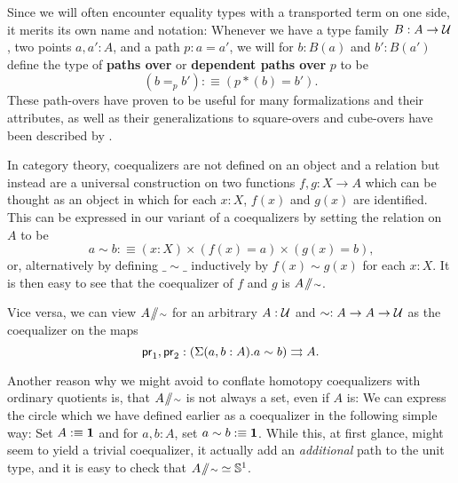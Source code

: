 \begin{remark}[Pathovers]
Since we will often encounter equality types with a transported term on one
side, it merits its own name and notation:
Whenever we have a type family $B : A \to \mathcal{U}$, two points $a, a' : A$,
and a path $p : a = a'$, we will for $b : B(a)$ and $b' : B(a')$ define the
type of
\textbf{paths over} or \textbf{dependent paths over} $p$ to be
\begin{equation*}
(b =_p b') :\equiv (p*(b) = b') \text{.}
\end{equation*}
These path-overs have proven to be useful for many formalizations and their
attributes, as well as their generalizations to square-overs and
cube-overs have been described by \cite{licatacubical}.
\end{remark}

\begin{remark}
In category theory, coequalizers are not defined on an object and a relation
but instead are a universal construction on two functions $f, g : X \to A$
which can be thought as an object in which for each $x : X$, $f(x)$ and $g(x)$ are identified.
This can be expressed in our variant of a coequalizers by setting the relation
on $A$ to be
\begin{equation*}
a \sim b :\equiv (x : X) \times (f(x) = a) \times (g(x) = b) \text{,}
\end{equation*}
or, alternatively by defining $\_\sim\_$ inductively by $f(x) \sim g(x)$ for each
$x : X$.
It is then easy to see that the coequalizer of $f$ and $g$ is $A \! \sslash \! {\scriptstyle \sim}$.

Vice versa, we can view $A \! \sslash \! {\scriptstyle \sim}$ for an arbitrary $A : \mathcal{U}$ and
$\sim : A \to A \to \mathcal{U}$ as the coequalizer on the maps
\begin{equation*}
 \mathsf{pr}_1,\mathsf{pr}_2 : \left(\Sigma(a,b : A).a \sim b\right) \rightrightarrows A \text{.}
\end{equation*}
\end{remark}

Another reason why we might avoid to conflate homotopy coequalizers with
ordinary quotients is, that $A \! \sslash \! {\scriptstyle \sim}$ is not always a set, even if $A$ is:
We can express the circle which we have defined earlier as a coequalizer
in the following simple way:
Set $A :\equiv \mathbf{1}$ and for $a , b : A$, set $a \sim b :\equiv \mathbf{1}$.
While this, at first glance, might seem to yield a trivial coequalizer,
it actually add an \emph{additional} path to the unit type, and
it is easy to check that $A \! \sslash \! {\scriptstyle \sim} \simeq \mathbb{S}^1$.

